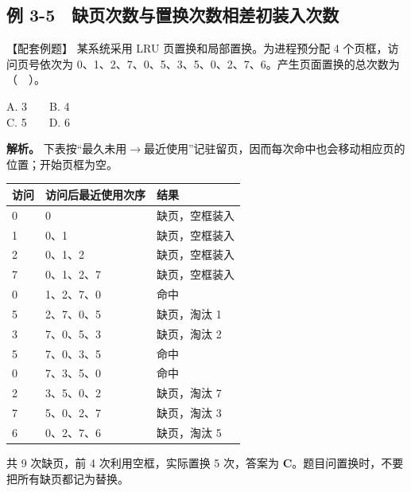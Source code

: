 \subsection{例 3-5　缺页次数与置换次数相差初装入次数}\label{OS03-ex5-5}

\begin{example}[配套例题]

【配套例题】 某系统采用 LRU 页置换和局部置换。为进程预分配 4 个页框，访问页号依次为 0、1、2、7、0、5、3、5、0、2、7、6。产生页面置换的总次数为（　）。

A. 3　　B. 4\\
C. 5　　D. 6

\end{example}

\textbf{解析。} 下表按“最久未用\ensuremath{\to}最近使用”记驻留页，因而每次命中也会移动相应页的位置；开始页框为空。

\begin{wideblock}

\par\medskip\noindent\begin{minipage}{\linewidth}\fontsize{9.3}{12}\selectfont\begin{tabularx}{\linewidth}{@{}YYY@{}}
\toprule\noalign{}
访问 & 访问后最近使用次序 & 结果 \\
\midrule\noalign{}


0 & 0 & 缺页，空框装入 \\
1 & 0、1 & 缺页，空框装入 \\
2 & 0、1、2 & 缺页，空框装入 \\
7 & 0、1、2、7 & 缺页，空框装入 \\
0 & 1、2、7、0 & 命中 \\
5 & 2、7、0、5 & 缺页，淘汰 1 \\
3 & 7、0、5、3 & 缺页，淘汰 2 \\
5 & 7、0、3、5 & 命中 \\
0 & 7、3、5、0 & 命中 \\
2 & 3、5、0、2 & 缺页，淘汰 7 \\
7 & 5、0、2、7 & 缺页，淘汰 3 \\
6 & 0、2、7、6 & 缺页，淘汰 5 \\
\bottomrule\end{tabularx}
\end{minipage}\par\medskip

\end{wideblock}

共 9 次缺页，前 4 次利用空框，实际置换 5 次，答案为 \textbf{C}。题目问置换时，不要把所有缺页都记为替换。

